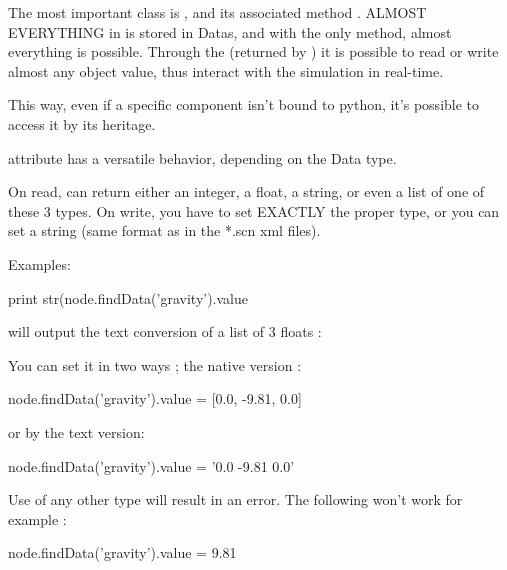 The most important class is , and its associated method .
ALMOST EVERYTHING in \sofa is stored in Datas, and with the only  method, almost everything is possible.
Through the  (returned by  ) it is possible to read or write almost any object value, thus interact with the simulation in real-time.

This way, even if a specific component isn't bound to python, it's possible to access it by its  heritage.

 attribute has a versatile behavior, depending on the Data type.

On read,  can return either an integer, a float, a string, or even a list of one of these 3 types.
On write, you have to set EXACTLY the proper type, or you can set a string (same format as in the *.scn xml files).

Examples:

\begin{code_python}
print str(node.findData('gravity').value
\end{code_python}
will output the text conversion of a list of 3 floats :
\begin{code_bash}
[0.0, -9.81, 0.0]
\end{code_bash}

You can set it in two ways ; the native version :
\begin{code_python}
node.findData('gravity').value = [0.0, -9.81, 0.0]
\end{code_python}
or by the text version:
\begin{code_python}
node.findData('gravity').value = '0.0  -9.81 0.0'
\end{code_python}

Use of any other type will result in an error.
The following won't work for example :
\begin{code_python}
node.findData('gravity').value = 9.81
\end{code_python}

